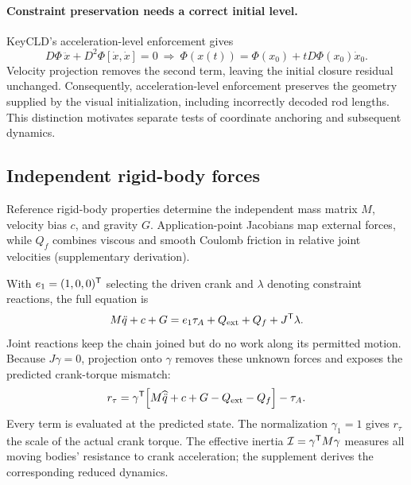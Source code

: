 \documentclass[10pt,twocolumn,letterpaper]{article}
\begin{document}
\paragraph{Constraint preservation needs a correct initial level.}
KeyCLD's acceleration-level enforcement gives
\begin{equation}
D\Phi\,\ddot x+D^2\Phi[\dot x,\dot x]=0
\ \Longrightarrow\
\Phi(x(t))=\Phi(x_0)+tD\Phi(x_0)\dot x_0.
\label{eq:levelset}
\end{equation}
Velocity projection removes the second term, leaving the initial closure residual unchanged. Consequently, acceleration-level enforcement preserves the geometry supplied by the visual initialization, including incorrectly decoded rod lengths. This distinction motivates separate tests of coordinate anchoring and subsequent dynamics.

\subsection{Independent rigid-body forces}
Reference rigid-body properties determine the independent mass matrix $M$, velocity bias $c$, and gravity $G$. Application-point Jacobians map external forces, while $Q_f$ combines viscous and smooth Coulomb friction in relative joint velocities (supplementary derivation).

With $e_1=(1,0,0)^{\mathsf T}$ selecting the driven crank and $\lambda$ denoting constraint reactions, the full equation is
\begin{equation}
M\ddot q+c+G=e_1\tau_A+Q_{\rm ext}+Q_f+J^{\mathsf T}\lambda.
\label{eq:dynamics}
\end{equation}
Joint reactions keep the chain joined but do no work along its permitted motion. Because $J\gamma=0$, projection onto $\gamma$ removes these unknown forces and exposes the predicted crank-torque mismatch:
\begin{equation}
r_\tau=\gamma^{\mathsf T}\!\left[M\widehat{\ddot q}+c+G-Q_{\rm ext}-Q_f\right]-\tau_A.
\label{eq:torque}
\end{equation}
Every term is evaluated at the predicted state. The normalization $\gamma_1=1$ gives $r_\tau$ the scale of the actual crank torque. The effective inertia $\mathcal I=\gamma^{\mathsf T} M\gamma$ measures all moving bodies' resistance to crank acceleration; the supplement derives the corresponding reduced dynamics.
\end{document}
